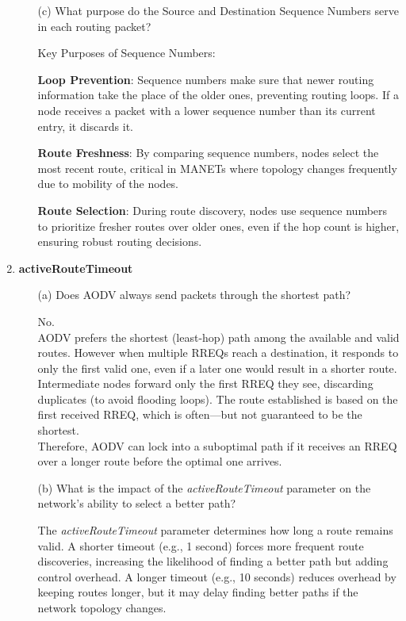 \documentclass[a4paper]{article}
\begin{document}
\begin{enumerate}
\begin{itemize}
				\item[(c)] What purpose do the Source and Destination Sequence Numbers serve in each routing packet?
				
				Key Purposes of Sequence Numbers:
				
				\textbf{Loop Prevention}: Sequence numbers make sure that newer routing information take the place of the older ones, preventing routing loops. If a node receives a packet with a lower sequence number than its current entry, it discards it.
				
				\textbf{Route Freshness}: By comparing sequence numbers, nodes select the most recent route, critical in MANETs where topology changes frequently due to mobility of the nodes.
				
				\textbf{Route Selection}: During route discovery, nodes use sequence numbers to prioritize fresher routes over older ones, even if the hop count is higher, ensuring robust routing decisions.
				
			\end{itemize}
			
			\item \textbf{activeRouteTimeout}
			
			\begin{itemize}
				\item[(a)] Does AODV always send packets through the shortest path?
				
				No.\\
				AODV prefers the shortest (least-hop) path among the available and valid routes. However when multiple RREQs reach a destination, it responds to only the first valid one, even if a later one would result in a shorter route.
				Intermediate nodes forward only the first RREQ they see, discarding duplicates (to avoid flooding loops).
				The route established is based on the first received RREQ, which is often—but not guaranteed to be the shortest.\\
				Therefore, AODV can lock into a suboptimal path if it receives an RREQ over a longer route before the optimal one arrives.
				
				\item[(b)] What is the impact of the \textit{activeRouteTimeout} parameter on the network’s ability to select a better path?
				
				The \textit{activeRouteTimeout} parameter determines how long a route remains valid. A shorter timeout (e.g., 1 second) forces more frequent route discoveries, increasing the likelihood of finding a better path but adding control overhead. A longer timeout (e.g., 10 seconds) reduces overhead by keeping routes longer, but it may delay finding better paths if the network topology changes.
				

\end{itemize}
\end{enumerate}
\end{document}
